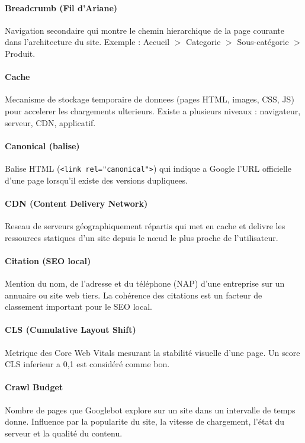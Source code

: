 \paragraph*{Breadcrumb (Fil d'Ariane)}
Navigation secondaire qui montre le chemin hierarchique de la page courante dans l'architecture du site. Exemple : Accueil $>$ Categorie $>$ Sous-catégorie $>$ Produit.

\paragraph*{Cache}
Mecanisme de stockage temporaire de donnees (pages HTML, images, CSS, JS) pour accelerer les chargements ulterieurs. Existe a plusieurs niveaux : navigateur, serveur, CDN, applicatif.

\paragraph*{Canonical (balise)}
Balise HTML (\texttt{<link rel="canonical">}) qui indique a Google l'URL officielle d'une page lorsqu'il existe des versions dupliquees.

\paragraph*{CDN (Content Delivery Network)}
Reseau de serveurs géographiquement répartis qui met en cache et delivre les ressources statiques d'un site depuis le nœud le plus proche de l'utilisateur.

\paragraph*{Citation (SEO local)}
Mention du nom, de l'adresse et du téléphone (NAP) d'une entreprise sur un annuaire ou site web tiers. La cohérence des citations est un facteur de classement important pour le SEO local.

\paragraph*{CLS (Cumulative Layout Shift)}
Metrique des Core Web Vitals mesurant la stabilité visuelle d'une page. Un score CLS inferieur a 0,1 est considéré comme bon.

\paragraph*{Crawl Budget}
Nombre de pages que Googlebot explore sur un site dans un intervalle de temps donne. Influence par la popularite du site, la vitesse de chargement, l'état du serveur et la qualité du contenu.

